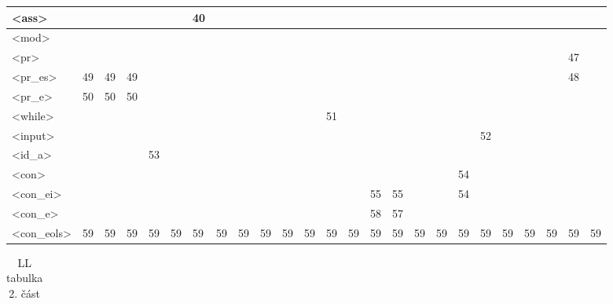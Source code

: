 \begin{normalsize}
\begin{enumerate}
\begin{landscape}
\begin{table}[htbp]
\begin{tabular}{|l|l|l|l|l|l|l|l|l|l|l|l|l|l|l|l|l|l|l|l|l|l|l|l|l|}
                    \\ \hline
                    <ass>&&&&&&40&&&&&&&&&&&&&&&&&&
                    \\ \hline
                    <mod>&&&&&&&&&&&&&&&&&&&&&&&&
                    \\ \hline
                    <pr>&&&&&&&&&&&&&&&&&&&&&&&47&
                    \\ \hline
                    <pr\_es>&49&49&49&&&&&&&&&&&&&&&&&&&&48&
                    \\ \hline
                    <pr\_e>&50&50&50&&&&&&&&&&&&&&&&&&&&&
                    \\ \hline
                    <while>&&&&&&&&&&&&51&&&&&&&&&&&&
                    \\ \hline
                    <input>&&&&&&&&&&&&&&&&&&&52&&&&&
                    \\ \hline
                    <id\_a>&&&&53&&&&&&&&&&&&&&&&&&&&
                    \\ \hline
                    <con>&&&&&&&&&&&&&&&&&&54&&&&&&
                    \\ \hline
                    <con\_ei>&&&&&&&&&&&&&&55&55&&&54&&&&&&
                    \\ \hline
                    <con\_e>&&&&&&&&&&&&&&58&57&&&&&&&&&
                    \\ \hline
                    <con\_eols>&59&59&59&59&59&59&59&59&59&59&59&59&59&59&59&59&59&59&59&59&59&59&59&59
                    \\ \hline
                \end{tabular}
            \end{table}
        \end{landscape}
        \newpage
        \begin{landscape}
            \begin{table}[htbp]
                \label{table:prec2}
                \centering
                \caption{LL tabulka 2. část}
                \begin{tabular}{|l|l|l|l|l|l|l|l|l|l|l|l|l|l|l|l|l|l|l|l|l|l|l|l|l|l|l|l|l|l|}
                    \hline



\end{tabular}
\end{table}
\end{landscape}
\end{enumerate}
\end{normalsize}
